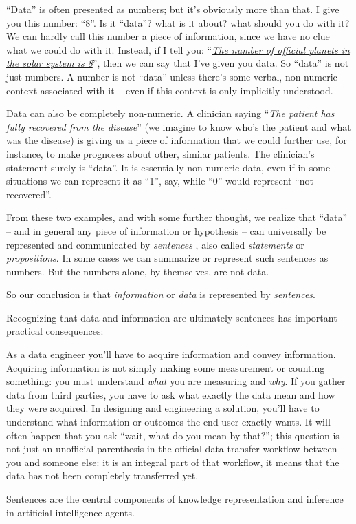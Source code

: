 \documentclass[
  letterpaper,
  DIV=11,
  numbers=noendperiod,
  oneside]{scrreprt}
\providecommand{\tightlist}{%
  \setlength{\itemsep}{0pt}\setlength{\parskip}{0pt}}\usepackage{longtable,booktabs,array}
\begin{document}
``Data'' is often presented as numbers; but it's obviously more than
that. I give you this number: ``8''. Is it ``data''? what is it about?
what should you do with it? We can hardly call this number a piece of
information, since we have no clue what we could do with it. Instead, if
I tell you:
``\emph{\href{https://solarsystem.nasa.gov/planets/overview}{The number
of official planets in the solar system is 8}}'', then we can say that
I've given you data. So ``data'' is not just numbers. A number is not
``data'' unless there's some verbal, non-numeric context associated with
it -- even if this context is only implicitly understood.

Data can also be completely non-numeric. A clinician saying ``\emph{The
patient has fully recovered from the disease}'' (we imagine to know
who's the patient and what was the disease) is giving us a piece of
information that we could further use, for instance, to make prognoses
about other, similar patients. The clinician's statement surely is
``data''. It is essentially non-numeric data, even if in some situations
we can represent it as ``1'', say, while ``0'' would represent ``not
recovered''.

From these two examples, and with some further thought, we realize that
``data'' -- and in general any piece of information or hypothesis -- can
universally be represented and communicated by \emph{sentences} , also
called \emph{statements} or \emph{propositions}.
In some cases we can summarize or represent such sentences as numbers.
But the numbers alone, by themselves, are not data.

So our conclusion is that \emph{information} or \emph{data} is
represented by \emph{sentences}.

Recognizing that data and information are ultimately sentences has
important practical consequences:

\begin{description}
\tightlist
\item[Clarity and goal-orientation.]
As a data engineer you'll have to acquire information and convey
information. Acquiring information is not simply making some measurement
or counting something: you must understand \emph{what} you are measuring
and \emph{why}. If you gather data from third parties, you have to ask
what exactly the data mean and how they were acquired. In designing and
engineering a solution, you'll have to understand what information or
outcomes the end user exactly wants. It will often happen that you ask
``wait, what do you mean by that?''; this question is not just an
unofficial parenthesis in the official data-transfer workflow between
you and someone else: it is an integral part of that workflow, it means
that the data has not been completely transferred yet.
\item[Artificial Intelligence]
Sentences are the central components of knowledge representation and
inference in artificial-intelligence agents.
\end{description}
\end{document}
